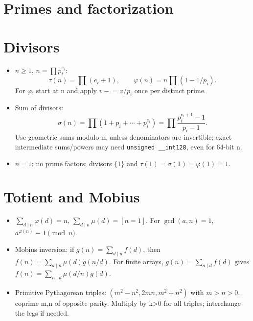 \section{Primes and factorization}

\section{Divisors}
\begin{itemize}[nosep,leftmargin=*]
\item $n\ge1$, $n=\prod p_i^{e_i}$:
\[
 \tau(n)=\prod(e_i+1),\qquad
 \varphi(n)=n\prod(1-1/p_i).
\]
For $\varphi$, start at n and apply $v\mathrel{-}=v/p_i$
once per distinct prime.
\item Sum of divisors:
\[
 \sigma(n)=\prod(1+p_i+\cdots+p_i^{e_i})
 =\prod\frac{p_i^{e_i+1}-1}{p_i-1}.
\]
Use geometric sums modulo m unless denominators are invertible;
exact intermediate sums/powers may need \texttt{unsigned \_\_int128},
even for 64-bit n.
\item $n=1$: no prime factors; divisors $\{1\}$ and
$\tau(1)=\sigma(1)=\varphi(1)=1$.
\end{itemize}
\section{Totient and Mobius}
\begin{itemize}[nosep,leftmargin=*]
\item $\sum_{d\mid n}\varphi(d)=n$, $\sum_{d\mid n}\mu(d)=[n=1]$.
For $\gcd(a,n)=1$, $a^{\varphi(n)}\equiv1\pmod n$.
\item Mobius inversion: if $g(n)=\sum_{d\mid n}f(d)$, then
$f(n)=\sum_{d\mid n}\mu(d)g(n/d)$.
For finite arrays, $g(n)=\sum_{n\mid d}f(d)$ gives
$f(n)=\sum_{n\mid d}\mu(d/n)g(d)$.
\item Primitive Pythagorean triples:
$(m^2-n^2,2mn,m^2+n^2)$ with $m>n>0$, coprime m,n of opposite parity.
Multiply by k>0 for all triples; interchange the legs if needed.
\end{itemize}
\par
